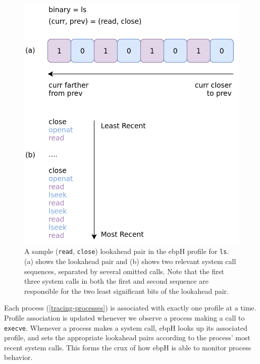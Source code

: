 \documentclass[
  12pt]{findlay}
\begin{document}
\begin{figure}
\begin{center}
\includegraphics[height=0.45\paperheight]{../figures/lookahead-ls.png}
\end{center}
\caption[A sample (\lstinline{read}, \lstinline{close}) lookahead pair in the ebpH profile for \lstinline{ls}.]
{
A sample (\lstinline{read}, \lstinline{close}) lookahead pair in the ebpH profile for \lstinline{ls}.
(a) shows the lookahead pair and (b) shows two relevant system call sequences, separated by several omitted calls.
Note that the first three system calls in both the first and second sequence are responsible for
the two least significant bits of the lookahead pair.
}
\label{lookahead-ls}
\end{figure}

Each process (\autoref{tracing-processes}) is associated with exactly
one profile at a time. Profile association is updated whenever we
observe a process making a call to \passthrough{\lstinline!execve!}.
Whenever a process makes a system call, ebpH looks up its associated
profile, and sets the appropriate lookahead pairs according to the
process' most recent system calls. This forms the crux of how ebpH is
able to monitor process behavior.
\end{document}
